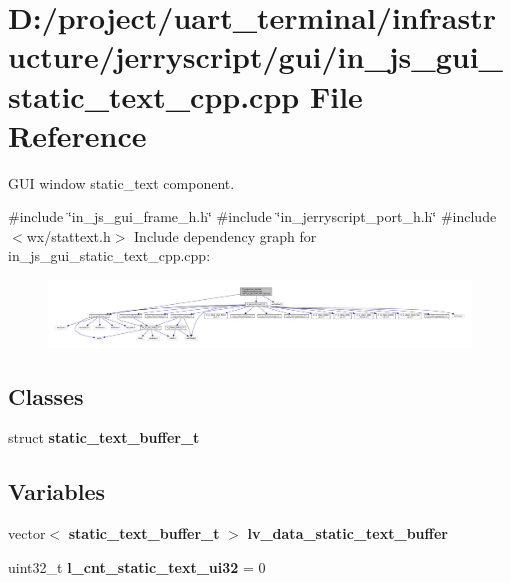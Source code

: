 \section{D\+:/project/uart\+\_\+terminal/infrastructure/jerryscript/gui/in\+\_\+js\+\_\+gui\+\_\+static\+\_\+text\+\_\+cpp.cpp File Reference}
\label{in__js__gui__static__text__cpp_8cpp}


G\+UI window static\+\_\+text component.  


{\ttfamily \#include \char`\"{}in\+\_\+js\+\_\+gui\+\_\+frame\+\_\+h.\+h\char`\"{}}\newline
{\ttfamily \#include \char`\"{}in\+\_\+jerryscript\+\_\+port\+\_\+h.\+h\char`\"{}}\newline
{\ttfamily \#include $<$wx/stattext.\+h$>$}\newline
Include dependency graph for in\+\_\+js\+\_\+gui\+\_\+static\+\_\+text\+\_\+cpp.\+cpp\+:
\nopagebreak
\begin{figure}[H]
\begin{center}
\leavevmode
\includegraphics[width=350pt]{in__js__gui__static__text__cpp_8cpp__incl}
\end{center}
\end{figure}
\subsection*{Classes}
\begin{DoxyCompactItemize}
\item 
struct \textbf{ static\+\_\+text\+\_\+buffer\+\_\+t}
\end{DoxyCompactItemize}
\subsection*{Variables}
\begin{DoxyCompactItemize}
\item 
vector$<$ \textbf{ static\+\_\+text\+\_\+buffer\+\_\+t} $>$ \textbf{ lv\+\_\+data\+\_\+static\+\_\+text\+\_\+buffer}
\item 
uint32\+\_\+t {\bfseries l\+\_\+cnt\+\_\+static\+\_\+text\+\_\+ui32} = 0
\end{DoxyCompactItemize}



